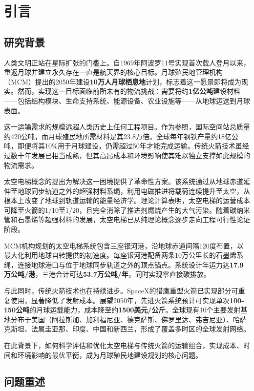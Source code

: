 \section{引言}

\subsection{研究背景}

人类文明正站在星际扩张的门槛上。自1969年阿波罗11号实现首次载人登月以来，重返月球并建立永久存在一直是航天界的核心目标。月球殖民地管理机构（MCM）提出的2050年建设\textbf{10万人月球栖息地}计划，标志着这一愿景即将成为现实。然而，实现这一目标面临前所未有的物流挑战：需要将约\textbf{1亿公吨}建设材料——包括结构模块、生命支持系统、能源设备、农业设施等——从地球运送到月球表面。

这一运输需求的规模远超人类历史上任何工程项目。作为参照，国际空间站总质量约420公吨，而月球殖民地所需材料是其23.8万倍。全球每年钢铁产量约18亿公吨，即便将其10\%用于月球建设，仍需超过50年才能完成运输。传统火箭技术虽经过数十年发展已相当成熟，但其高昂成本和环境影响使其难以独立支撑如此规模的物流需求。

太空电梯概念的提出为解决这一困境提供了革命性方案。该系统通过从地球赤道延伸至地球同步轨道之外的超强材料系绳，利用电磁推进将载荷连续提升至太空，从根本上改变了地球到轨道运输的能量经济学。理论计算表明，太空电梯的运营成本可降至火箭的1/10至1/20，且完全消除了推进剂燃烧产生的大气污染。随着碳纳米管和石墨烯等超强材料的发展，太空电梯已从纯理论概念逐步走向工程可行性论证阶段。

MCM机构规划的太空电梯系统包含三座银河港，沿地球赤道间隔120度布置，以最大化利用地球自转提供的初速度。每座银河港配备两条10万公里长的石墨烯系绳，连接地球港口与位于地球同步轨道之外的顶点锚点。系统设计年运力达\textbf{17.9万公吨/港}，三港合计可达\textbf{53.7万公吨/年}，同时实现零直接碳排放。

与此同时，传统火箭技术也在持续进步。SpaceX的猎鹰重型火箭已实现部分可重复使用，显著降低了发射成本。展望2050年，先进火箭系统预计可实现单次\textbf{100-150公吨}的月球运载能力，成本降至约\textbf{1500美元/公斤}。全球现有10个主要发射基地分布于美国（阿拉斯加、加利福尼亚、德克萨斯、佛罗里达、弗吉尼亚）、哈萨克斯坦、法属圭亚那、印度、中国和新西兰，形成了覆盖多时区的全球发射网络。

在此背景下，如何科学评估和优化太空电梯与传统火箭的运输组合，实现成本、时间和环境影响的最优平衡，成为月球殖民地建设规划的核心问题。

\subsection{问题重述}


